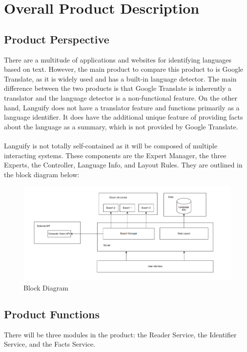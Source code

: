 \section{Overall Product Description}
\label{sec:overall_description}


\subsection{Product Perspective}
\label{sub:product_perspective}
There are a multitude of applications and websites for identifying languages based on text. However, the main product to compare this product to is Google Translate, 
as it is widely used and has a built-in language detector. The main difference between the two products is that Google Translate is inherently a translator
and the language detector is a non-functional feature. On the other hand, Languify does not have a translator feature and functions primarily as a language identifier.
It does have the additional unique feature of providing facts about the language as a summary, which is not provided by Google Translate. \\ \\
Languify is not totally self-contained as it will be composed of multiple interacting systems. These components are the Expert Manager, the three Experts, 
the Controller, Language Info, and Layout Rules. They are outlined in the block diagram below:

\begin{figure}[H]
	\centering
	\includegraphics{Section2/Block_Diagram.png}
	\caption{Block Diagram}
	\label{BlockDiagram}
\end{figure}

\subsection{Product Functions}
\label{sub:product_functions}
There will be three modules in the product: the Reader Service, the Identifier Service, and the Facts Service.

